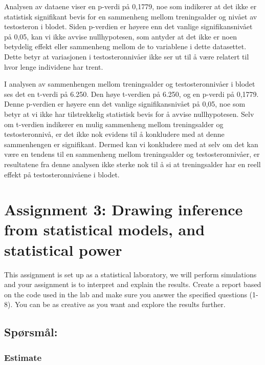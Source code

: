 \documentclass[
  letterpaper,
  DIV=11,
  numbers=noendperiod]{scrreprt}
\begin{document}
Analysen av dataene viser en p-verdi på 0,1779, noe som indikerer at det
ikke er statistisk signifikant bevis for en sammenheng mellom
treningsalder og nivået av testosteron i blodet. Siden p-verdien er
høyere enn det vanlige signifikansnivået på 0,05, kan vi ikke avvise
nullhypotesen, som antyder at det ikke er noen betydelig effekt eller
sammenheng mellom de to variablene i dette datasettet. Dette betyr at
variasjonen i testosteronnivåer ikke ser ut til å være relatert til hvor
lenge individene har trent.

I analysen av sammenhengen mellom treningsalder og testosteronnivåer i
blodet ses det en t-verdi på 6.250. Den høye t-verdien på 6.250, og en
p-verdi på 0,1779. Denne p-verdien er høyere enn det vanlige
signifikansnivået på 0,05, noe som betyr at vi ikke har tilstrekkelig
statistisk bevis for å avvise nullhypotesen. Selv om t-verdien indikerer
en mulig sammenheng mellom treningsalder og testosteronnivå, er det ikke
nok evidens til å konkludere med at denne sammenhengen er signifikant.
Dermed kan vi konkludere med at selv om det kan være en tendens til en
sammenheng mellom treningsalder og testosteronnivåer, er resultatene fra
denne analysen ikke sterke nok til å si at treningsalder har en reell
effekt på testosteronnivåene i blodet.


\chapter{Assignment 3: Drawing inference from statistical models, and
statistical power}\label{assignment3}

This assignment is set up as a statistical laboratory, we will perform
simulations and your assignment is to interpret and explain the results.
Create a report based on the code used in the lab and make sure you
answer the specified questions (1-8). You can be as creative as you want
and explore the results further.

\section{Spørsmål:}\label{spuxf8rsmuxe5l}

\subsection{Estimate}\label{estimate}
\end{document}
